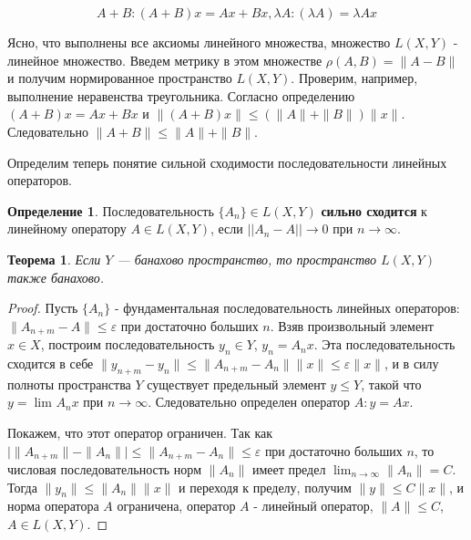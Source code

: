 \documentclass[12pt,a4paper,titlepage,oneside]{book}
\theoremstyle{definition}
\newtheorem*{definition}{Определение}
\theoremstyle{plain}
\newtheorem*{theorem}{Теорема}
\theoremstyle{remark}
\theoremstyle{remark}
\theoremstyle{remark}
\theoremstyle{remark}
\theoremstyle{plain}
\theoremstyle{plain}
\begin{document}
$$A+B: (A+B)x = Ax+Bx, \lambda A: (\lambda A) = \lambda Ax$$

Ясно, что выполнены все аксиомы линейного множества, множество $L(X,Y)$ - линейное множество. Введем метрику в этом множестве $\rho(A, B) = \parallel A-B\parallel$ и получим нормированное пространство $L(X,Y)$. Проверим, например, выполнение неравенства треугольника. Согласно определению $(A+B)x = Ax+Bx$ и $\parallel(A+B)x\parallel\le(\parallel A\parallel+\parallel B\parallel)\parallel x\parallel$. Следовательно $\parallel A+B\parallel\le\parallel A\parallel+\parallel B\parallel$.

Определим теперь понятие сильной сходимости последовательности линейных операторов.

\begin{definition}
Последовательность $\{A_n\}\in L(X,Y)$ \textbf{сильно сходится} к линейному оператору $A\in L(X,Y)$, если $||A_n-A||\to 0$ при $n\to {\infty}$.
\end{definition}

\begin{theorem}
Если $Y$ --- банахово пространство, то пространство $L(X,Y)$ также банахово.
\end{theorem}

\begin{proof}
Пусть $\{A_n\}$ - фундаментальная последовательность линейных операторов: $\parallel A_{n+m}-A\parallel\le \varepsilon$ при достаточно больших $n$. Взяв произвольный элемент $x\in X$, построим последовательность $y_n\in Y$, $y_n=A_nx$. Эта последовательность сходится в себе $\parallel y_{n+m}-y_n\parallel\le \parallel A_{n+m}-A_n\parallel \parallel x\parallel\le \varepsilon \parallel x\parallel$, и в силу полноты пространства $Y$ существует предельный элемент $y\le Y$, такой что $y=\lim_{} A_nx$ при $n \to \infty$. Следовательно определен оператор $A: y=Ax$.

Покажем, что этот оператор ограничен. Так как $\lvert \parallel A_{n+m} \parallel-\parallel A_n\parallel \rvert \le \parallel A_{n+m}-A_n\parallel \le \varepsilon$ при достаточно больших $n$, то числовая последовательность норм $\parallel A_n\parallel$ имеет предел $\lim_{n\to \infty} \parallel A_n\parallel=C$. Тогда $\parallel y_n\parallel\le\parallel A_n\parallel \parallel x\parallel$ и переходя к пределу, получим $\parallel y\parallel\le C\parallel x\parallel$, и норма оператора $A$ ограничена, оператор $A$ - линейный оператор, $\parallel A\parallel\le C$, $A\in L(X,Y)$.
\end{proof}
\end{document}
